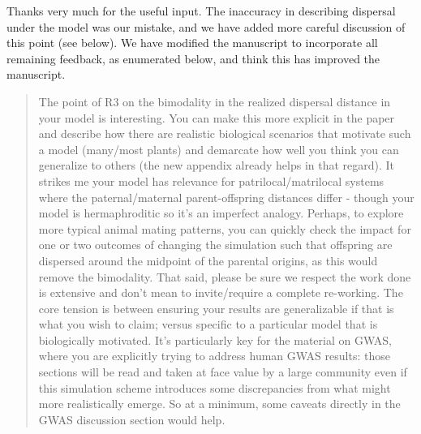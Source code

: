 Thanks very much for the useful input.
The inaccuracy in describing dispersal under the model was our mistake,
and we have added more careful discussion of this point (see below).
We have modified the manuscript to incorporate all remaining feedback,
as enumerated below,
and think this has improved the manuscript.


\begin{quote}
The point of R3 on the bimodality in the realized dispersal distance in your model is interesting. You can make this more explicit in the paper and describe how there are realistic biological scenarios that motivate such a model (many/most plants) and demarcate how well you think you can generalize to others (the new appendix already helps in that regard). It strikes me your model has relevance for patrilocal/matrilocal systems where the paternal/maternal parent-offspring distances differ - though your model is hermaphroditic so it's an imperfect analogy. Perhaps, to explore more typical animal mating patterns, you can quickly check the impact for one or two outcomes of changing the simulation such that offspring are dispersed around the midpoint of the parental origins, as this would remove the bimodality. That said, please be sure we respect the work done is extensive and don't mean to invite/require a complete re-working. The core tension is between ensuring your results are generalizable if that is what you wish to claim; versus specific to a particular model that is biologically motivated. It's particularly key for the material on GWAS, where you are explicitly trying to address human GWAS results: those sections will be read and taken at face value by a large community even if this simulation scheme introduces some discrepancies from what might more realistically emerge. So at a minimum, some caveats directly in the GWAS discussion section would help.
\end{quote}


